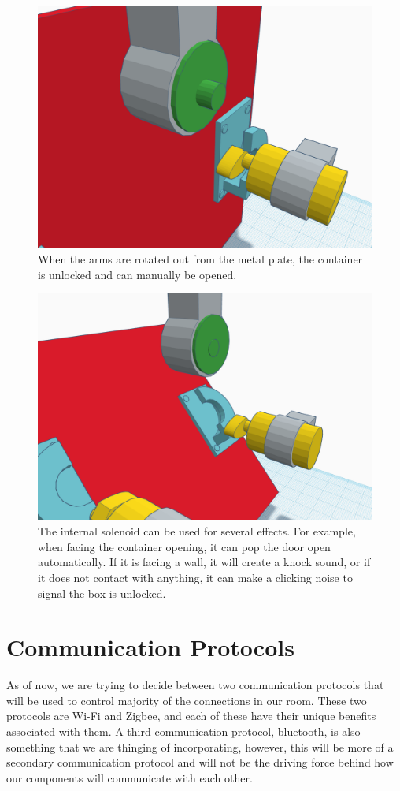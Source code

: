 \documentclass[conference]{IEEEtran}
\begin{document}
\begin{figure}[H]
    \centering
    \includegraphics[width=0.85\columnwidth]{Images/OpenLock.png}
    \caption{When the arms are rotated out from the metal plate, the container is unlocked and can manually be opened.}
\end{figure}

\begin{figure}[H]
    \centering
    \includegraphics[width=0.85\columnwidth]{Images/OpenContainer.png}
    \caption{The internal solenoid can be used for several effects. For example, when facing the container opening, it can pop the 
    door open automatically. If it is facing a wall, it will create a knock sound, or if it does not contact with anything, it can
    make a clicking noise to signal the box is unlocked.}
\end{figure}

\section{Communication Protocols}
As of now, we are trying to decide between two communication protocols that will be used
to control majority of the connections in our room. These two protocols are Wi-Fi and Zigbee,
and each of these have their unique benefits associated with them. A third communication
protocol, bluetooth, is also something that we are thinging of incorporating, however, this
will be more of a secondary communication protocol and will not be the driving force behind
how our components will communicate with each other.
\end{document}
